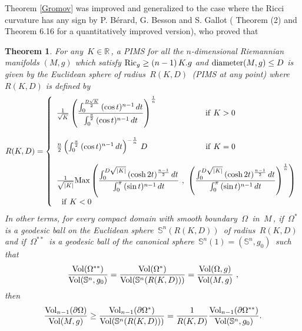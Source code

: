 \documentclass[11pt, reqno]{amsart}
\newtheorem{theoreme}{Theorem}[section]
\theoremstyle{plain}
\begin{document}
Theorem \ref{Gromov} was improved and generalized to the case where the Ricci curvature has any sign
by P. B\'{e}rard, G. Besson and S. Gallot (\cite{B-B-G} Theorem (2) and \cite{Ga2}
Theorem 6.16 for a quantitatively improved version), who proved that

\begin{theoreme}\label{B-C-G} For any $\,K \in \mathbb R\,$, a PIMS  for all the 
$n$-dimensional Riemannian manifolds $(M,g)$ which satisfy ${\rm Ric}_g \ge (n-1)\,K .g$ 
and ${\rm diameter} (M,g) \leq D$ is given
by the Euclidean sphere of radius $\,R(K , D)\,$ (PIMS at any point) where $R(K, D)$ is defined by
 {\small $$ R(K , D) =  \left\{\begin{array}{l}
\frac{1}{\sqrt{K}} \left( \dfrac{\int_0^{\frac{D\sqrt{K}}{2}}\, (\cos t)^{n-1}\, dt}
{\int_0^{\frac{\pi}{2}}\, (\cos t)^{n-1}\, dt}\right)^{\frac{1}{n}} \ \ \ \ \ \ \ \ \ \ \  \ \ \ \ \ \ \  
{\rm if \ } K > 0\ \ \\ \\ 
\frac{n}{2} \left( \int_0^{\frac{\pi}{2}}\, (\cos t)^{n-1}\, dt \right)^{-\frac{1}{n}}\, D
 \ \ \ \ \ \ \ \ \ \ \ \ \ \ \  \ \ \ \ \ \ \  {\rm if \ } K = 0\ \ \\ \\
\frac{1}{\sqrt{|K|}} {\rm Max} \left(  \dfrac{\int_0^{D \sqrt{|K|}}\, 
(\cosh 2t)^{\frac{n-1}{2}}\, dt}{\int_0^{\pi}\, (\sin t)^{n-1}\, dt}\ ,\ 
\left( \dfrac{\int_0^{D \sqrt{|K|}}\, 
(\cosh 2t)^{\frac{n-1}{2}}\, dt}{\int_0^{\pi}\, (\sin t)^{n-1}\, dt}\right)^{\frac{1}{n}} \right)\\ 
\ \  {\rm if \ } K < 0
\end{array}\right.$$}
In other terms, for every compact domain with smooth boundary $\,\Omega \,$ in 
$\, M \,$, if $\,\Omega^*\,$ is a geodesic ball on the Euclidean sphere 
$\, \mathbb S^n (R(K , D))\,$ of radius 
$\,R(K , D)\,$ and if $\,\Omega^{**}\,$ is a geodesic ball of  the canonical sphere 
$\, \mathbb S^n (1) = (\mathbb S^n , g_0 )\,$ such that 
$$\dfrac{{\rm Vol} (\Omega^{**})}{{\rm Vol} (\mathbb S^n , g_0 )} =
\dfrac{{\rm Vol} (\Omega^* )}{{\rm Vol} (\mathbb S^n (R(K , D)))} 
= \dfrac{{\rm Vol} (\Omega , g )}{{\rm Vol} (M , g )}\ ,$$ 
then
\begin{equation}\label{sharpness}
\dfrac{{\rm Vol}_{n-1}(\partial \Omega)}{{\rm Vol} (M , g )} \ge 
\dfrac{{\rm Vol}_{n-1}(\partial \Omega^*)}{{\rm Vol} (\mathbb S^n (R(K, D)) )} =
\frac{1}{R(K , D)} \dfrac{{\rm Vol}_{n-1}(\partial \Omega^{**})}{{\rm Vol}  (\mathbb S^n , g_0 )}  .
\end{equation}
\end{theoreme}
\end{document}
